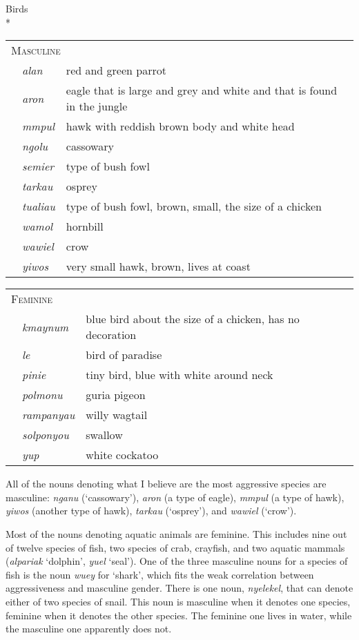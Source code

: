 \documentclass[output=collectionpaper]{langsci/langscibook}
\begin{document}
\ea
\label{ex:Dry:43}
Birds \\*
\begin{tabularx}{0.9\textwidth}{lp{1.8cm}X}
\multicolumn{3}{l}{ \textsc{Masculine}}\\
& \textit{alan} & red and green parrot\\
& \textit{aron} & eagle that is large and grey and white and that is found in the jungle\\
& \textit{mmpul} & hawk with reddish brown body and white head\\
& \textit{ngolu} & cassowary\\
& \textit{semier} & type of bush fowl\\
& \textit{tarkau} & osprey\\
& \textit{tualiau} & type of bush fowl, brown, small, the size of a chicken\\
& \textit{wamol} & hornbill\\
& \textit{wawiel} & crow\\
& \textit{yiwos} & very small hawk, brown, lives at coast\\
\end{tabularx}

\begin{tabularx}{0.9\textwidth}{lp{1.8cm}X}
\multicolumn{3}{l}{ \textsc{Feminine}}\\
& \textit{kmaynum} & blue bird about the size of a chicken, has no decoration\\
& \textit{le} & bird of paradise\\
& \textit{pinie} & tiny bird, blue with white around neck\\
& \textit{polmonu} & guria pigeon\\
& \textit{rampanyau} & willy wagtail\\
& \textit{solponyou} & swallow\\
& \textit{yup} & white cockatoo\\
\end{tabularx}
\z

All of the nouns denoting what I believe are the most aggressive species are masculine: \textit{nganu} (`cassowary'), \textit{aron} (a type of eagle), \textit{mmpul} (a type of hawk), \textit{yiwos} (another type of hawk), \textit{tarkau} (`osprey'), and \textit{wawiel} (`crow').

Most of the nouns denoting aquatic animals are feminine. This includes nine out of twelve species of fish, two species of crab, crayfish, and two aquatic mammals (\textit{alpariak} `dolphin', \textit{yuel} `seal'). One of the three masculine nouns for a species of fish is the noun \textit{wuey} for `shark', which fits the weak correlation between aggressiveness and masculine gender. There is one noun, \textit{nyelekel}, that can denote either of two species of snail. This noun is masculine when it denotes one species, feminine when it denotes the other species. The feminine one lives in water, while the masculine one apparently does not.
\end{document}
